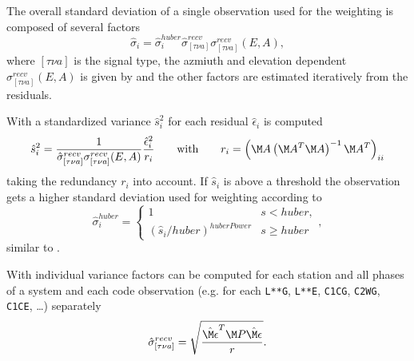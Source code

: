 The overall standard deviation of a single observation used for the weighting
is composed of several factors
\begin{equation}
  \hat{\sigma}_i = \hat{\sigma}_i^{huber} \hat{\sigma}_{[\tau\nu a]}^{recv} \sigma_{[\tau\nu a]}^{recv}(E,A),
\end{equation}
where $[\tau\nu a]$ is the signal type, the azmiuth and elevation dependent $\sigma_{[\tau\nu a]}^{recv}(E,A)$ is given by
 and the other factors are
estimated iteratively from the residuals.

With  a standardized variance $\hat{s}_i^2$
for each residual $\hat{\epsilon}_i$ is computed
\begin{equation}
  \hat{s}_i^2 = \frac{1}{\hat{\sigma}_{[\tau\nu a]}^{recv} \sigma_{[\tau\nu a]}^{recv}(E,A)}\frac{\hat{\epsilon}_i^2}{r_i}
  \qquad\text{with}\qquad
  r_i = \left(\M A\left(\M A^T\M A\right)^{-1}\M A^T\right)_{ii}
\end{equation}
taking the redundancy $r_i$ into account. If $\hat{s}_i$ is above a threshold 
the observation gets a higher standard deviation used for weighting according to
\begin{equation}
  \hat{\sigma}_i^{huber} =
  \left\{ \begin{array}{ll}
    1                              & s < huber,\\
    (\hat{s}_i/huber)^{huberPower} & s \ge huber
  \end{array} \right.,
\end{equation}
similar to .

With  individual variance factors can be computed
for each station and all phases of a system and each code observation 
(e.g. for each \verb|L**G|, \verb|L**E|, \verb|C1CG|, \verb|C2WG|, \verb|C1CE|, \ldots)
separately
\begin{equation}
  \hat{\sigma}_{[\tau\nu a]}^{recv} = \sqrt{\frac{\hat{\M\epsilon}^T\M P\hat{\M\epsilon}}{r}}.
\end{equation}


